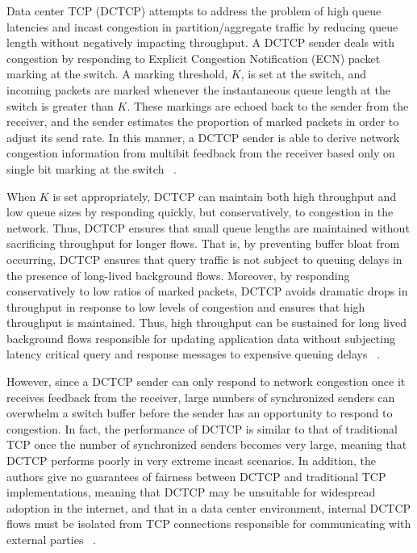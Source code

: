 Data center TCP (DCTCP) attempts to address the problem of high queue latencies and incast congestion in partition/aggregate traffic by reducing queue length without negatively impacting throughput. A DCTCP sender deals with congestion by responding to Explicit Congestion Notification (ECN) packet marking at the switch. A marking threshold, $K$, is set at the switch, and incoming packets are marked whenever the instantaneous queue length at the switch is greater than $K$. These markings are echoed back to the sender from the receiver, and the sender estimates the proportion of marked packets in order to adjust its send rate. In this manner, a DCTCP sender is able to derive network congestion information from multibit feedback from the receiver based only on single bit marking at the switch ~\cite{alizadeh_data_2010}.

When $K$ is set appropriately, DCTCP can maintain both high throughput and low queue sizes by responding quickly, but conservatively, to congestion in the network. Thus, DCTCP ensures that small queue lengths are maintained without sacrificing throughput for longer flows. That is, by preventing buffer bloat from occurring, DCTCP ensures that query traffic is not subject to queuing delays in the presence of long-lived background flows. Moreover, by responding conservatively to low ratios of marked packets, DCTCP avoids dramatic drops in throughput in response to low levels of congestion and ensures that high throughput is maintained. Thus, high throughput can be sustained for long lived background flows responsible for updating application data without subjecting latency critical query and response messages to expensive queuing delays ~\cite{alizadeh_data_2010}.

However, since a DCTCP sender can only respond to network congestion once it receives feedback from the receiver, large numbers of synchronized senders can overwhelm a switch buffer before the sender has an opportunity to respond to congestion. In fact, the performance of DCTCP is similar to that of traditional TCP once the number of synchronized senders becomes very large, meaning that DCTCP performs poorly in very extreme incast scenarios. In addition, the authors give no guarantees of fairness between DCTCP and traditional TCP implementations, meaning that DCTCP may be unsuitable for widespread adoption in the internet, and that in a data center environment, internal DCTCP flows must be isolated from TCP connections responsible for communicating with external parties ~\cite{alizadeh_data_2010}. 

